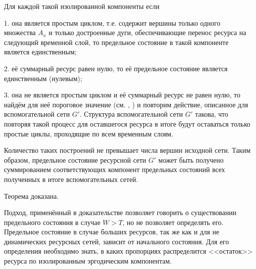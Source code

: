 \documentclass[a4paper,12pt]{article}
\begin{document}
Для каждой такой изолированной компоненты если 

1. она является простым циклом, т.е. содержит вершины только одного множества $A_x$ и только достроенные дуги, обеспечивающие перенос ресурса на следующий временной слой, то предельное состояние в такой компоненте является единственным;

2. её суммарный ресурс равен нулю, то её предельное состояние является единственным (нулевым);

3. она не является простым циклом и её суммарный ресурс не равен нулю, то найдём для неё пороговое значение (см. \cite{SvSkor:SkorAbdur}, \cite{SvSkor:Skor}) и повторим действие, описанное для вспомогательной сети $G'$. Структура вспомогательной сети $G'$ такова, что повторяя такой процесс для оставшегося ресурса в итоге будут оставаться только простые циклы, проходящие по всем временным слоям.

Количество таких построений не превышает числа вершин исходной сети. Таким образом, предельное состояние ресурсной сети $G'$ может быть получено суммированием соответствующих компонент предельных состояний всех полученных в итоге вспомогательных сетей.

Теорема доказана.

		
Подход, применённый в доказательстве позволяет говорить о существовании предельного состояния в случае $W>T$, но не позволяет определять его. Предельное состояние в случае больших ресурсов, так же как и для не динамических ресурсных сетей, зависит от начального состояния. Для его определения необходимо знать, в каких пропорциях распределится <<остаток>> ресурса по изолированным эргодическим компонентам.
	
\end{document}
